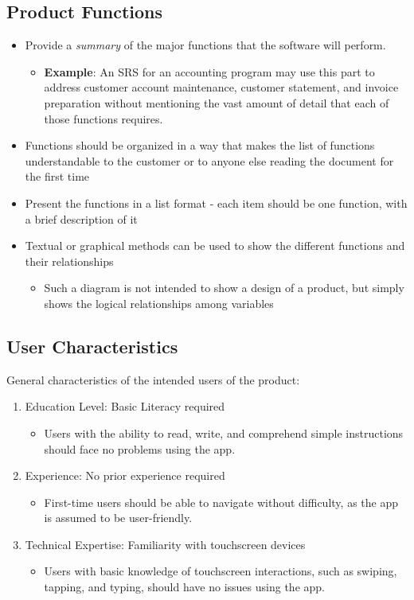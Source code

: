 \documentclass[]{article}
\begin{document}
\subsection{Product Functions}
\label{sub:product_functions}
\begin{itemize}
	\item Provide a \emph{summary} of the major functions that the software will perform.
	\begin{itemize}
		\item \textbf{Example}: An SRS for an accounting program may use this part to address customer account maintenance, customer statement, and invoice preparation without mentioning the vast amount of detail that each of those functions requires.
	\end{itemize}
	\item Functions should be organized in a way that makes the list of functions understandable to the customer or to anyone else reading the document for the first time 
	\item Present the functions in a list format - each item should be one function, with a brief description of it
	\item Textual or graphical methods can be used to show the different functions and their relationships
	\begin{itemize}
		\item Such a diagram is not intended to show a design of a product, but simply shows the logical relationships among variables
	\end{itemize} 
\end{itemize}

\subsection{User Characteristics}
\label{sub:user_characteristics}
General characteristics of the intended users of the product:
\begin{enumerate}
	\item Education Level: Basic Literacy required
	\begin{itemize}
		\item Users with the ability to read, write, and comprehend simple instructions should face no problems using the app.
	\end{itemize}
	\item Experience: No prior experience required
	\begin{itemize}
		\item First-time users should be able to navigate without difficulty, as the app is assumed to be user-friendly.
	\end{itemize}
	\item Technical Expertise: Familiarity with touchscreen devices
	\begin{itemize}
		\item Users with basic knowledge of touchscreen interactions, such as swiping, tapping, and typing, should have no issues using the app.
	\end{itemize}
\end{enumerate}
\end{document}
